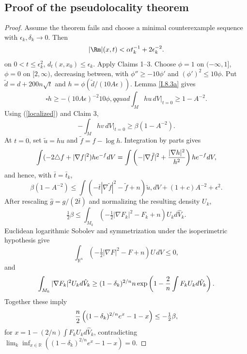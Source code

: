 \subsection{Proof of the pseudolocality theorem}
 \label{pfI.10.1}
\begin{proof}
\sketch
Assume the theorem fails and choose a minimal counterexample sequence with
$\epsilon_k,\delta_k\to0$. Then
\begin{equation}\label{largebound}|\Rm|(x,t)<\alpha t_k^{-1}+2\epsilon_k^{-2}.\end{equation}
on $0<t\le\epsilon_k^2$, $d_t(x,x_0)\le\epsilon_k$. Apply Claims 1--3.
Choose $\phi=1$ on $(-\infty,1]$, $\phi=0$ on $[2,\infty)$, decreasing between,
with $\phi''\ge-10\phi'$ and $(\phi')^2\le10\phi$. Put
$\tilde d=d+200n\sqrt t$ and $h=\phi(\tilde d/(10A\epsilon))$. Lemma
\ref{I.8.3a} gives
\begin{equation}\square h\ge-(10A\epsilon)^{-2}10\phi,qquad
\int_Mhu\,dV\big|_{t=0}\ge1-A^{-2}.\label{ut}
\end{equation}
Using (\ref{localized}) and Claim 3,
\begin{equation}-\int_Mhv\,dV\big|_{t=0}\ge\beta(1-A^{-2}).\end{equation}
At $t=0$, set $\tilde u=hu$ and $\tilde f=f-\log h$. Integration by parts gives
\begin{equation}
\int(-2\triangle f+|\nabla f|^2)he^{-f}dV
=\int\left(-|\nabla\tilde f|^2+{|\nabla h|^2\over h^2}\right)he^{-f}dV,
\end{equation}
and hence, with $\bar t=\bar t_k$,
\begin{equation}\label{somme}
\beta(1-A^{-2})\le\int(-\bar t|\nabla\tilde f|^2-\tilde f+n)\tilde u,dV+(1+c)A^{-2}+\epsilon^2.
\end{equation}
After rescaling $\hat g=g/(2\bar t)$ and normalizing the resulting density $U_k$,
\begin{equation}\label{contra1}
\tfrac12\beta\le\int_{M_k}\left(-\tfrac12|\nabla F_k|^2-F_k+n\right)U_kd\hat V_k.
\end{equation}
Euclidean logarithmic Sobolev and symmetrization under the isoperimetric hypothesis
give
\begin{equation}\label{Beckner}\int_{\mathbb R^n}(-\tfrac12|\nabla F|^2-F+n)U\,dV\le0,
\end{equation}
and
\begin{equation}\label{contra2}
\int_{M_k}|\nabla F_k|^2U_kd\hat V_k\ge(1-\delta_k)^{2/n}n\exp\left(1-{2\over n}\int F_kU_kd\hat V_k\right).
\end{equation}
Together these imply
\begin{equation}
{n\over2}\left((1-\delta_k)^{2/n}e^x-1-x\right)\le-\tfrac12\beta,
\end{equation}
for $x=1-(2/n)\int F_kU_kd\hat V_k$, contradicting
$\lim_k\inf_{x\in\mathbb R}((1-\delta_k)^{2/n}e^x-1-x)=0$.
\end{proof}

